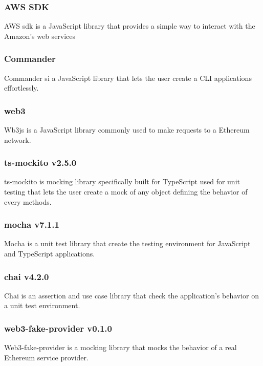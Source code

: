 \subsubsection*{AWS SDK}
AWS sdk is a JavaScript library that provides a simple way to interact with the Amazon’s web services

\subsubsection*{Commander}
Commander si a JavaScript library that lets the user create a CLI applications effortlessly.

\subsubsection*{web3}
Wb3js is a JavaScript library commonly used to make requests to a Ethereum network.

\subsubsection*{ts-mockito v2.5.0}
ts-mockito is mocking library specifically built for TypeScript used for unit testing that lets the user create a mock of any object defining the behavior of every methods.

\subsubsection*{mocha v7.1.1}
Mocha is a unit test library that create the testing environment for JavaScript and TypeScript applications.

\subsubsection*{chai v4.2.0}
Chai is an assertion and use case library that check the application's behavior on a unit test environment.

\subsubsection*{web3-fake-provider v0.1.0}
Web3-fake-provider is a mocking library that mocks the behavior of a real Ethereum service provider.

